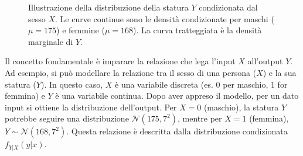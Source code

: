 \begin{figure}[ht]
\centering
{}
\caption{Illustrazione della distribuzione della statura \(Y\) condizionata dal sesso \(X\). Le curve continue sono le densità condizionate per maschi (\(\mu=175\)) e femmine (\(\mu=168\)). La curva tratteggiata è la densità marginale di \(Y\).}
\label{fig:distribuzione-mista-gauss}
\end{figure}

Il concetto fondamentale è imparare la relazione che lega l'input \(X\) all'output \(Y\). Ad esempio, si può modellare la relazione tra il sesso di una persona (\(X\)) e la sua statura (\(Y\)). In questo caso, \(X\) è una variabile discreta (es. 0 per maschio, 1 for femmina) e \(Y\) è una variabile continua. Dopo aver appreso il modello, per un dato input si ottiene la distribuzione dell'output. Per \(X=0\) (maschio), la statura \(Y\) potrebbe seguire una distribuzione \(\mathcal{N}(175, 7^2)\), mentre per \(X=1\) (femmina), \(Y \sim \mathcal{N}(168, 7^2)\). Questa relazione è descritta dalla distribuzione condizionata \(f_{Y|X}(y|x)\).

